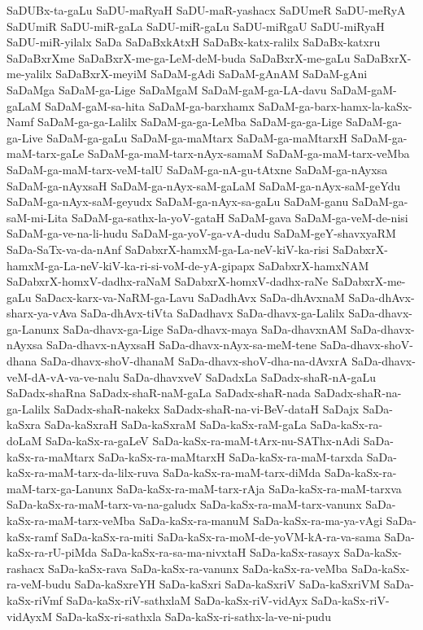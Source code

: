 {SaDUBx-ta-gaLu
SaDU-maRyaH
SaDU-maR-yashacx
SaDUmeR
SaDU-meRyA
SaDUmiR
SaDU-miR-gaLa
SaDU-miR-gaLu
SaDU-miRgaU
SaDU-miRyaH
SaDU-miR-yilalx
SaDa
SaDaBxkAtxH
SaDaBx-katx-ralilx
SaDaBx-katxru
SaDaBxrXme
SaDaBxrX-me-ga-LeM-deM-buda
SaDaBxrX-me-gaLu
SaDaBxrX-me-yalilx
SaDaBxrX-meyiM
SaDaM-gAdi
SaDaM-gAnAM
SaDaM-gAni
SaDaMga
SaDaM-ga-Lige
SaDaMgaM
SaDaM-gaM-ga-LA-davu
SaDaM-gaM-gaLaM
SaDaM-gaM-sa-hita
SaDaM-ga-barxhamx
SaDaM-ga-barx-hamx-la-kaSx-Namf
SaDaM-ga-ga-Lalilx
SaDaM-ga-ga-LeMba
SaDaM-ga-ga-Lige
SaDaM-ga-ga-Live
SaDaM-ga-gaLu
SaDaM-ga-maMtarx
SaDaM-ga-maMtarxH
SaDaM-ga-maM-tarx-gaLe
SaDaM-ga-maM-tarx-nAyx-samaM
SaDaM-ga-maM-tarx-veMba
SaDaM-ga-maM-tarx-veM-talU
SaDaM-ga-nA-gu-tAtxne
SaDaM-ga-nAyxsa
SaDaM-ga-nAyxsaH
SaDaM-ga-nAyx-saM-gaLaM
SaDaM-ga-nAyx-saM-geYdu
SaDaM-ga-nAyx-saM-geyudx
SaDaM-ga-nAyx-sa-gaLu
SaDaM-ganu
SaDaM-ga-saM-mi-Lita
SaDaM-ga-sathx-la-yoV-gataH
SaDaM-gava
SaDaM-ga-veM-de-nisi
SaDaM-ga-ve-na-li-hudu
SaDaM-ga-yoV-ga-vA-dudu
SaDaM-geY-shavxyaRM
SaDa-SaTx-va-da-nAnf
SaDabxrX-hamxM-ga-La-neV-kiV-ka-risi
SaDabxrX-hamxM-ga-La-neV-kiV-ka-ri-si-voM-de-yA-gipapx
SaDabxrX-hamxNAM
SaDabxrX-homxV-dadhx-raNaM
SaDabxrX-homxV-dadhx-raNe
SaDabxrX-me-gaLu
SaDacx-karx-va-NaRM-ga-Lavu
SaDadhAvx
SaDa-dhAvxnaM
SaDa-dhAvx-sharx-ya-vAva
SaDa-dhAvx-tiVta
SaDadhavx
SaDa-dhavx-ga-Lalilx
SaDa-dhavx-ga-Lanunx
SaDa-dhavx-ga-Lige
SaDa-dhavx-maya
SaDa-dhavxnAM
SaDa-dhavx-nAyxsa
SaDa-dhavx-nAyxsaH
SaDa-dhavx-nAyx-sa-meM-tene
SaDa-dhavx-shoV-dhana
SaDa-dhavx-shoV-dhanaM
SaDa-dhavx-shoV-dha-na-dAvxrA
SaDa-dhavx-veM-dA-vA-va-ve-nalu
SaDa-dhavxveV
SaDadxLa
SaDadx-shaR-nA-gaLu
SaDadx-shaRna
SaDadx-shaR-naM-gaLa
SaDadx-shaR-nada
SaDadx-shaR-na-ga-Lalilx
SaDadx-shaR-nakekx
SaDadx-shaR-na-vi-BeV-dataH
SaDajx
SaDa-kaSxra
SaDa-kaSxraH
SaDa-kaSxraM
SaDa-kaSx-raM-gaLa
SaDa-kaSx-ra-doLaM
SaDa-kaSx-ra-gaLeV
SaDa-kaSx-ra-maM-tArx-nu-SAThx-nAdi
SaDa-kaSx-ra-maMtarx
SaDa-kaSx-ra-maMtarxH
SaDa-kaSx-ra-maM-tarxda
SaDa-kaSx-ra-maM-tarx-da-lilx-ruva
SaDa-kaSx-ra-maM-tarx-diMda
SaDa-kaSx-ra-maM-tarx-ga-Lanunx
SaDa-kaSx-ra-maM-tarx-rAja
SaDa-kaSx-ra-maM-tarxva
SaDa-kaSx-ra-maM-tarx-va-na-galudx
SaDa-kaSx-ra-maM-tarx-vanunx
SaDa-kaSx-ra-maM-tarx-veMba
SaDa-kaSx-ra-manuM
SaDa-kaSx-ra-ma-ya-vAgi
SaDa-kaSx-ramf
SaDa-kaSx-ra-miti
SaDa-kaSx-ra-moM-de-yoVM-kA-ra-va-sama
SaDa-kaSx-ra-rU-piMda
SaDa-kaSx-ra-sa-ma-nivxtaH
SaDa-kaSx-rasayx
SaDa-kaSx-rashacx
SaDa-kaSx-rava
SaDa-kaSx-ra-vanunx
SaDa-kaSx-ra-veMba
SaDa-kaSx-ra-veM-budu
SaDa-kaSxreYH
SaDa-kaSxri
SaDa-kaSxriV
SaDa-kaSxriVM
SaDa-kaSx-riVmf
SaDa-kaSx-riV-sathxlaM
SaDa-kaSx-riV-vidAyx
SaDa-kaSx-riV-vidAyxM
SaDa-kaSx-ri-sathxla
SaDa-kaSx-ri-sathx-la-ve-ni-pudu
}

